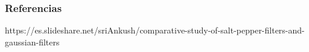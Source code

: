 \subsubsection*{Referencias}
https://es.slideshare.net/sriAnkush/comparative-study-of-salt-pepper-filters-and-gaussian-filters

